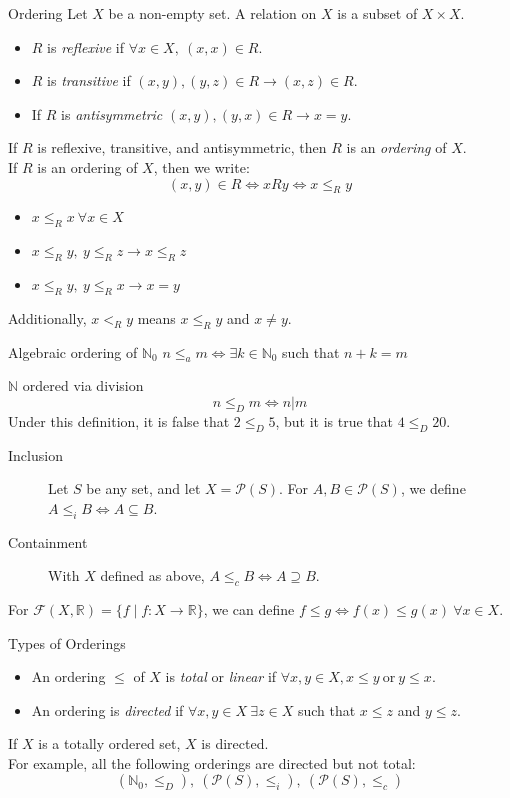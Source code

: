 \documentclass[10pt]{extarticle}
\newcommand{\N}{\mathbb{N}}
\newcommand{\R}{\mathbb{R}}
\begin{document}
  \begin{problem}{Ordering}
    Let $X$ be a non-empty set. A relation on $X$ is a subset of $X\times X$.
    \begin{itemize}
      \item $R$ is \textit{reflexive} if $\forall x\in X,~(x,x)\in R$.
      \item $R$ is \textit{transitive} if $(x,y),(y,z)\in R \rightarrow (x,z)\in R$.
      \item If $R$ is \textit{antisymmetric} $(x,y),(y,x)\in R\rightarrow x=y$. 
    \end{itemize}
    If $R$ is reflexive, transitive, and antisymmetric, then $R$ is an \textit{ordering} of $X$.\\

    If $R$ is an ordering of $X$, then we write:
    \[
      (x,y)\in R \Leftrightarrow xRy \Leftrightarrow x\leq_{R} y
    \] 
    \begin{itemize}
      \item $x\leq_{R}x~\forall x\in X$
      \item $x\leq_R y,~y\leq_R z \rightarrow x\leq_R z$
      \item $x\leq_R y,~y\leq_R x \rightarrow x=y$
    \end{itemize}
    Additionally, $x<_R y$ means $x\leq_R y$ and $x\neq y$.
    \begin{problem}{Algebraic ordering of $\N_0$}
      $n\leq_a m\Leftrightarrow \exists k\in \N_0$ such that $n+k = m$
    \end{problem}
    \begin{problem}{$\N$ ordered via division}
      $$n\leq_D m \Leftrightarrow n|m$$
      Under this definition, it is false that $2\leq_D 5$, but it is true that $4\leq_D 20$.
    \end{problem}
    \begin{description}
      \item[Inclusion] Let $S$ be any set, and let $X = \mathcal{P}(S)$. For $A,B\in \mathcal{P}(S)$, we define $A\leq_i B \Leftrightarrow A\subseteq B$.
      \item[Containment] With $X$ defined as above, $A\leq_c B\Leftrightarrow A\supseteq B$.
    \end{description}
    For $\mathcal{F}(X,\R) = \{f\mid f:X\rightarrow\R\}$, we can define $f\leq g\Leftrightarrow f(x)\leq g(x)~\forall x\in X$.
  \end{problem}
  \begin{problem}{Types of Orderings}
    \begin{itemize}
      \item An ordering $\leq$ of $X$ is \textit{total} or \textit{linear} if $\forall x,y\in X, x\leq y~\text{or}~y\leq x$. 
      \item An ordering is \textit{directed} if $\forall x,y\in X~\exists z\in X$ such that $x\leq z$ and $y\leq z$.
    \end{itemize}
    If $X$ is a totally ordered set, $X$ is directed.\\

    For example, all the following orderings are directed but not total:
    \[
      (\N_0,\leq_D),~(\mathcal{P}(S),\leq_i),~(\mathcal{P}(S),\leq_c)
    \] 
  \end{problem}
\end{document}
